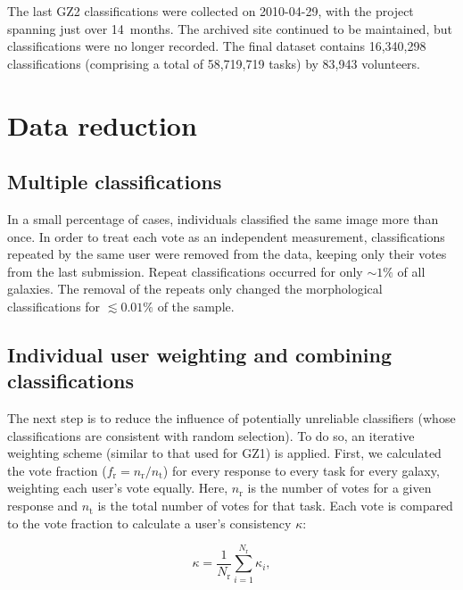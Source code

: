 \documentclass[useAMS,usenatbib]{mn2e}
\begin{document}
The last GZ2 classifications were collected on 2010-04-29, with the project spanning just over 14~months. The archived site continued to be maintained, but classifications were no longer recorded. The final dataset contains 16,340,298 classifications (comprising a total of 58,719,719 tasks) by 83,943 volunteers.


\section{Data reduction} \label{sec-datareduction}

\subsection{Multiple classifications}
In a small percentage of cases, individuals classified the same image more than once. In order to treat each vote as an independent measurement, classifications repeated by the same user were removed from the data, keeping only their votes from the last submission. Repeat classifications occurred for only $\sim1\%$ of all galaxies. The removal of the repeats only changed the morphological classifications for $\lesssim0.01\%$ of the sample.  

\subsection{Individual user weighting and combining classifications}\label{ssec-consistency}

The next step is to reduce the influence of potentially unreliable classifiers (whose classifications are consistent with random selection). To do so, an iterative weighting scheme (similar to that used for GZ1) is applied. First, we calculated the vote fraction ($f_\mathrm{r} = n_\mathrm{r}/n_\mathrm{t}$) for every response to every task for every galaxy, weighting each user's vote equally. Here, $n_\mathrm{r}$ is the number of votes for a given response and $n_\mathrm{t}$ is the total number of votes for that task. Each vote is compared to the vote fraction to calculate a user's consistency $\kappa$:

\begin{equation}
\kappa = \frac{1}{N_\mathrm{r}}\sum\limits_{i=1}^{N_\mathrm{r}}{\kappa_i},
\label{eqn-consistency}
\end{equation}
\end{document}
